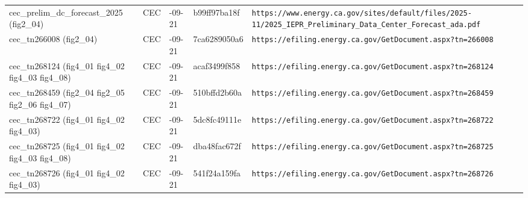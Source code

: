 \begin{longtable}{>{\raggedright\arraybackslash}p{3.0cm}>{\raggedright\arraybackslash}p{1.5cm}>{\raggedright\arraybackslash}p{1.4cm}>{\raggedright\arraybackslash}p{2.0cm}>{\raggedright\arraybackslash}p{6.0cm}}
cec\_\allowbreak{}prelim\_\allowbreak{}dc\_\allowbreak{}forecast\_\allowbreak{}2025 (fig2\_\allowbreak{}04) & CEC & 2026-09-21 & b99ff97ba18f & \texttt{https:\allowbreak{}/\allowbreak{}/\allowbreak{}www.\allowbreak{}energy.\allowbreak{}ca.\allowbreak{}gov/\allowbreak{}sites/\allowbreak{}default/\allowbreak{}files/\allowbreak{}2025-\allowbreak{}11/\allowbreak{}2025\_\allowbreak{}IEPR\_\allowbreak{}Preliminary\_\allowbreak{}Data\_\allowbreak{}Center\_\allowbreak{}Forecast\_\allowbreak{}ada.\allowbreak{}pdf} \\
cec\_\allowbreak{}tn266008 (fig2\_\allowbreak{}04) & CEC & 2026-09-21 & 7ca6289050a6 & \texttt{https:\allowbreak{}/\allowbreak{}/\allowbreak{}efiling.\allowbreak{}energy.\allowbreak{}ca.\allowbreak{}gov/\allowbreak{}GetDocument.\allowbreak{}aspx?\allowbreak{}tn=\allowbreak{}266008} \\
cec\_\allowbreak{}tn268124 (fig4\_\allowbreak{}01 fig4\_\allowbreak{}02 fig4\_\allowbreak{}03 fig4\_\allowbreak{}08) & CEC & 2026-09-21 & acaf3499f858 & \texttt{https:\allowbreak{}/\allowbreak{}/\allowbreak{}efiling.\allowbreak{}energy.\allowbreak{}ca.\allowbreak{}gov/\allowbreak{}GetDocument.\allowbreak{}aspx?\allowbreak{}tn=\allowbreak{}268124} \\
cec\_\allowbreak{}tn268459 (fig2\_\allowbreak{}04 fig2\_\allowbreak{}05 fig2\_\allowbreak{}06 fig4\_\allowbreak{}07) & CEC & 2026-09-21 & 510bffd2b60a & \texttt{https:\allowbreak{}/\allowbreak{}/\allowbreak{}efiling.\allowbreak{}energy.\allowbreak{}ca.\allowbreak{}gov/\allowbreak{}GetDocument.\allowbreak{}aspx?\allowbreak{}tn=\allowbreak{}268459} \\
cec\_\allowbreak{}tn268722 (fig4\_\allowbreak{}01 fig4\_\allowbreak{}02 fig4\_\allowbreak{}03) & CEC & 2026-09-21 & 5dc8fc49111e & \texttt{https:\allowbreak{}/\allowbreak{}/\allowbreak{}efiling.\allowbreak{}energy.\allowbreak{}ca.\allowbreak{}gov/\allowbreak{}GetDocument.\allowbreak{}aspx?\allowbreak{}tn=\allowbreak{}268722} \\
cec\_\allowbreak{}tn268725 (fig4\_\allowbreak{}01 fig4\_\allowbreak{}02 fig4\_\allowbreak{}03 fig4\_\allowbreak{}08) & CEC & 2026-09-21 & dba48fac672f & \texttt{https:\allowbreak{}/\allowbreak{}/\allowbreak{}efiling.\allowbreak{}energy.\allowbreak{}ca.\allowbreak{}gov/\allowbreak{}GetDocument.\allowbreak{}aspx?\allowbreak{}tn=\allowbreak{}268725} \\
cec\_\allowbreak{}tn268726 (fig4\_\allowbreak{}01 fig4\_\allowbreak{}02 fig4\_\allowbreak{}03) & CEC & 2026-09-21 & 541f24a159fa & \texttt{https:\allowbreak{}/\allowbreak{}/\allowbreak{}efiling.\allowbreak{}energy.\allowbreak{}ca.\allowbreak{}gov/\allowbreak{}GetDocument.\allowbreak{}aspx?\allowbreak{}tn=\allowbreak{}268726} \\

\end{longtable}
